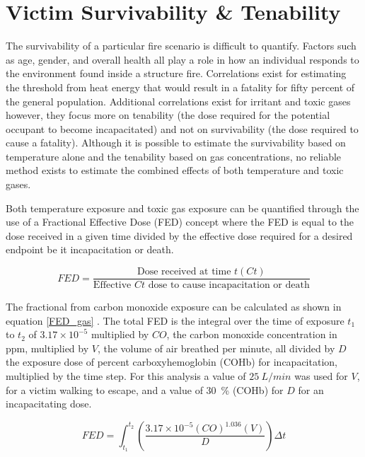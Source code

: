 \documentclass[12pt,oneside]{book}
\begin{document}
\section{Victim Survivability \& Tenability}
The survivability of a particular fire scenario is difficult to quantify. Factors such as age, gender, and overall health all play a role in how an individual responds to the environment found inside a structure fire. Correlations exist for estimating the threshold from heat energy that would result in a fatality for fifty percent of the general population. Additional correlations exist for irritant and toxic gases however, they focus more on tenability (the dose required for the potential occupant to become incapacitated) and not on survivability (the dose required to cause a fatality). Although it is possible to estimate the survivability based on temperature alone and the tenability based on gas concentrations, no reliable method exists to estimate the combined effects of both temperature and toxic gases. \cite{SFPE:Purser}

Both temperature exposure and toxic gas exposure can be quantified through the use of a Fractional Effective Dose (FED) concept where the FED is equal to the dose received in a given time divided by the effective dose required for a desired endpoint be it incapacitation or death. 

\begin{equation}
	FED = \frac{\text{Dose received at time } t(Ct)}{\text{Effective } Ct \text{ dose to cause incapacitation or death}}
	\label{FED_general}
\end{equation} 

The fractional from carbon monoxide exposure can be calculated as shown in equation \ref{FED_gas} \cite{SFPE:Purser}. The total FED is the integral over the time of exposure $t_1$ to $t_2$ of $3.17 \times  10^{-5}$ multiplied by $CO$, the carbon monoxide concentration in ppm, multiplied by $V$, the volume of air breathed per minute, all divided by $D$ the exposure dose of percent carboxyhemoglobin (COHb) for incapacitation, multiplied by the time step. For this analysis a value of $25~L/min$ was used for $V$, for a victim walking to escape, and a value of 30~\% (COHb) for $D$ for an incapacitating dose.

\begin{equation}
	FED = \int_{t_1}^{t_2}\left(\frac{3.17 \times 10^{-5} \left(CO\right)^{1.036} \left(V\right)}{D}\right) \Delta t
	\label{FED_gas}
\end{equation}
\end{document}
